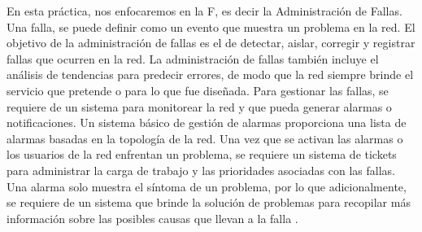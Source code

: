 En esta práctica, nos enfocaremos en la F, es decir la Administración de Fallas.
\newline
Una falla, se puede definir como un evento que muestra un problema en la red. El objetivo de la administración de fallas es el de detectar, aislar, corregir y registrar fallas que ocurren en la red. 
\newline
La administración de fallas también incluye el análisis de tendencias para predecir errores, de modo que la red siempre brinde el servicio que pretende o para lo que fue diseñada.
\newline
Para gestionar las fallas, se requiere de un sistema para monitorear la red y que pueda generar alarmas o notificaciones. Un sistema básico de gestión de alarmas proporciona una lista de alarmas basadas en la topología de la red. Una vez que se activan las alarmas o los usuarios de la red enfrentan un problema, se requiere un sistema de tickets para administrar la carga de trabajo y las prioridades asociadas con las fallas. 
\newline
Una alarma solo muestra el síntoma de un problema, por lo que adicionalmente, se requiere de un sistema que brinde la solución de problemas para recopilar más información sobre las posibles causas que llevan a la falla \cite{FCAPS}.

